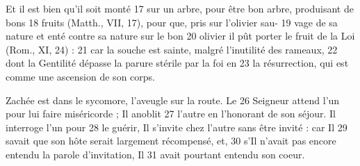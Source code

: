 Et il est bien qu'il soit monté	 
17	 	sur un arbre, pour être bon arbre, produisant de bons	 
18	 	fruits (Matth., VII, 17), pour que, pris sur l'olivier sau-	 
19	 	vage de sa nature et enté contre sa nature sur le bon	 
20	 	olivier il pût porter le fruit de la Loi (Rom., XI, 24) :	 
21	 	car la souche est sainte, malgré l'inutilité des rameaux,	 
22	 	dont la Gentilité dépasse la parure stérile par la foi en	 
23	 	la résurrection, qui est comme une ascension de son corps.

Zachée est dans le sycomore, l'aveugle sur la route. Le	 
26	 	Seigneur attend l'un pour lui faire miséricorde ; Il anoblit	 
27	 	l'autre en l'honorant de son séjour. Il interroge l'un pour	 
28	 	le guérir, Il s'invite chez l'autre sans être invité : car Il	 
29	 	savait que son hôte serait largement récompensé, et,	 
30	 	s'Il n'avait pas encore entendu la parole d'invitation, Il	 
31	 	avait pourtant entendu son coeur.